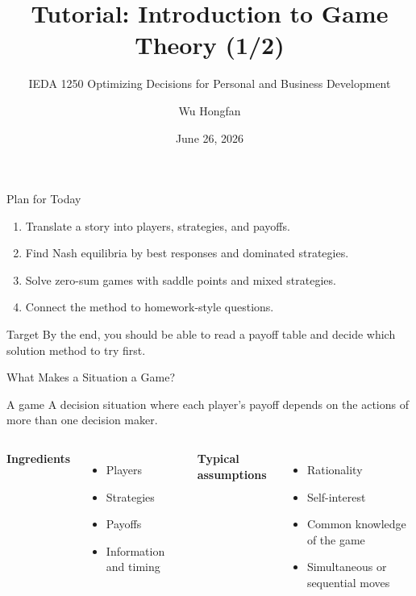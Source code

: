 \documentclass[10pt,aspectratio=169]{beamer}
\title[Game Theory Tutorial]{Tutorial: Introduction to Game Theory (1/2)}
\subtitle{IEDA 1250 Optimizing Decisions for Personal and Business Development}
\author{Wu Hongfan}
\institute{The Hong Kong University of Science and Technology}
\date{June 26, 2026}
\begin{document}
\begin{frame}
  \titlepage
\end{frame}

\begin{frame}{Plan for Today}
\begin{enumerate}
  \item Translate a story into players, strategies, and payoffs.
  \item Find Nash equilibria by best responses and dominated strategies.
  \item Solve zero-sum games with saddle points and mixed strategies.
  \item Connect the method to homework-style questions.
\end{enumerate}
\vspace{0.4cm}
\begin{block}{Target}
By the end, you should be able to read a payoff table and decide which solution method to try first.
\end{block}
\end{frame}

\begin{frame}{What Makes a Situation a Game?}
\begin{block}{A game}
A decision situation where each player's payoff depends on the actions of more than one decision maker.
\end{block}
\vspace{0.2cm}
\begin{columns}[T]
\textbf{Ingredients}
\begin{itemize}
  \item Players
  \item Strategies
  \item Payoffs
  \item Information and timing
\end{itemize}
\textbf{Typical assumptions}
\begin{itemize}
  \item Rationality
  \item Self-interest
  \item Common knowledge of the game
  \item Simultaneous or sequential moves
\end{itemize}
\end{columns}
\end{frame}
\end{document}
